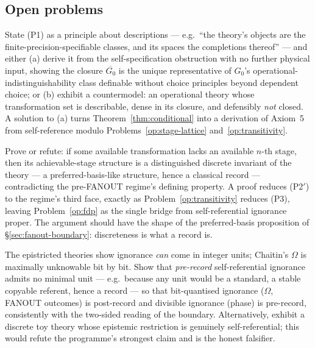 \subsection{Open problems}
\label{app:cont-openproblems}

\begin{openproblem}\label{op:fdp}
State (P1) as a principle about descriptions --- e.g.\ ``the theory's objects are the
finite-precision-specifiable classes, and its spaces the completions thereof'' --- and
either (a) derive it from the self-specification obstruction with no further physical
input, showing the closure $\overline{G_0}$ is the unique representative of $G_0$'s
operational-indistinguishability class definable without choice principles beyond
dependent choice; or (b) exhibit a countermodel: an operational theory whose
transformation set is describable, dense in its closure, and defensibly \emph{not}
closed. A solution to (a) turns Theorem~\ref{thm:conditional} into a derivation of
Axiom~5 from self-reference modulo Problems~\ref{op:stage-lattice}
and~\ref{op:transitivity}.
\end{openproblem}

\begin{openproblem}
\label{op:stage-lattice}
Prove or refute: if some available transformation lacks an available $n$-th stage, then
its achievable-stage structure is a distinguished discrete invariant of the theory ---
a preferred-basis-like structure, hence a classical record --- contradicting the
pre-FANOUT regime's defining property. A proof reduces (P2$'$) to the regime's third
face, exactly as Problem~\ref{op:transitivity} reduces (P3), leaving
Problem~\ref{op:fdp} as the single bridge from self-referential ignorance proper. The
argument should have the shape of the preferred-basis proposition of
\S\ref{sec:fanout-boundary}: discreteness is what a record is.
\end{openproblem}

\begin{openproblem}
\label{op:quantised}
The epistricted theories show ignorance \emph{can} come in integer units; Chaitin's
$\Omega$ is maximally unknowable bit by bit. Show that \emph{pre-record} self-referential
ignorance admits no minimal unit --- e.g.\ because any unit would be a standard, a stable
copyable referent, hence a record --- so that bit-quantised ignorance ($\Omega$, FANOUT
outcomes) is post-record and divisible ignorance (phase) is pre-record, consistently
with the two-sided reading of the boundary. Alternatively, exhibit a discrete toy theory
whose epistemic restriction is genuinely self-referential; this would refute the
programme's strongest claim and is the honest falsifier.
\end{openproblem}

